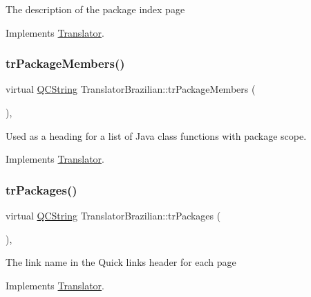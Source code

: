 The description of the package index page 

Implements \mbox{\hyperlink{class_translator}{Translator}}.

\mbox{\label{class_translator_brazilian_ad88ce429867fa975160a641943137c69}} 
\subsubsection{\texorpdfstring{trPackageMembers()}{trPackageMembers()}}
{\footnotesize\ttfamily virtual \mbox{\hyperlink{class_q_c_string}{Q\+C\+String}} Translator\+Brazilian\+::tr\+Package\+Members (\begin{DoxyParamCaption}{ }\end{DoxyParamCaption})\hspace{0.3cm}{\ttfamily [inline]}, {\ttfamily [virtual]}}

Used as a heading for a list of Java class functions with package scope. 

Implements \mbox{\hyperlink{class_translator}{Translator}}.

\mbox{\label{class_translator_brazilian_abb2987b46908dcc2deb9fa6e094e6fb7}} 
\subsubsection{\texorpdfstring{trPackages()}{trPackages()}}
{\footnotesize\ttfamily virtual \mbox{\hyperlink{class_q_c_string}{Q\+C\+String}} Translator\+Brazilian\+::tr\+Packages (\begin{DoxyParamCaption}{ }\end{DoxyParamCaption})\hspace{0.3cm}{\ttfamily [inline]}, {\ttfamily [virtual]}}

The link name in the Quick links header for each page 

Implements \mbox{\hyperlink{class_translator}{Translator}}.

\mbox{\label{class_translator_brazilian_a38d7901548a970805cb697a1ea256878}} 
